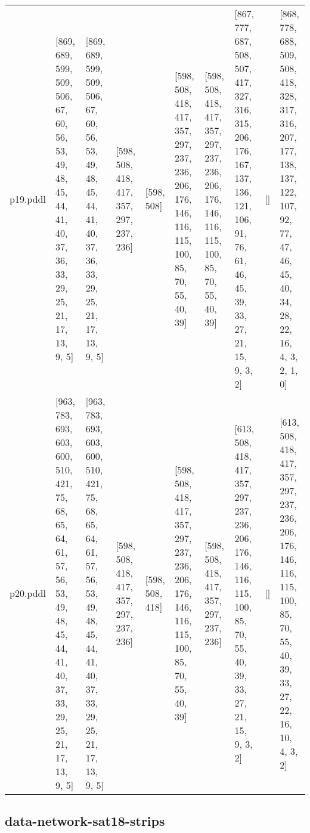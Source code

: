 \documentclass{article}
\begin{document}
\begin{tabular}{@{}lrrrrrrrrr@{}}
p19.pddl & \multicolumn{1}{|l|}{[869, 689, 599, 509, 506, 67, 60, 56, 53, 49, 48, 45, 44, 41, 40, 37, 36, 33, 29, 25, 21, 17, 13, 9, 5]} & \multicolumn{1}{|l|}{[869, 689, 599, 509, 506, 67, 60, 56, 53, 49, 48, 45, 44, 41, 40, 37, 36, 33, 29, 25, 21, 17, 13, 9, 5]} & \multicolumn{1}{|l|}{[598, 508, 418, 417, 357, 297, 237, 236]} & \multicolumn{1}{|l|}{[598, 508]} & \multicolumn{1}{|l|}{[598, 508, 418, 417, 357, 297, 237, 236, 206, 176, 146, 116, 115, 100, 85, 70, 55, 40, 39]} & \multicolumn{1}{|l|}{[598, 508, 418, 417, 357, 297, 237, 236, 206, 176, 146, 116, 115, 100, 85, 70, 55, 40, 39]} & \multicolumn{1}{|l|}{[867, 777, 687, 508, 507, 417, 327, 316, 315, 206, 176, 167, 137, 136, 121, 106, 91, 76, 61, 46, 45, 39, 33, 27, 21, 15, 9, 3, 2]} & \multicolumn{1}{|l|}{[]} & \multicolumn{1}{|l|}{[868, 778, 688, 509, 508, 418, 328, 317, 316, 207, 177, 138, 137, 122, 107, 92, 77, 47, 46, 45, 40, 34, 28, 22, 16, 4, 3, 2, 1, 0]} \\
p20.pddl & \multicolumn{1}{|l|}{[963, 783, 693, 603, 600, 510, 421, 75, 68, 65, 64, 61, 57, 56, 53, 49, 48, 45, 44, 41, 40, 37, 33, 29, 25, 21, 17, 13, 9, 5]} & \multicolumn{1}{|l|}{[963, 783, 693, 603, 600, 510, 421, 75, 68, 65, 64, 61, 57, 56, 53, 49, 48, 45, 44, 41, 40, 37, 33, 29, 25, 21, 17, 13, 9, 5]} & \multicolumn{1}{|l|}{[598, 508, 418, 417, 357, 297, 237, 236]} & \multicolumn{1}{|l|}{[598, 508, 418]} & \multicolumn{1}{|l|}{[598, 508, 418, 417, 357, 297, 237, 236, 206, 176, 146, 116, 115, 100, 85, 70, 55, 40, 39]} & \multicolumn{1}{|l|}{[598, 508, 418, 417, 357, 297, 237, 236]} & \multicolumn{1}{|l|}{[613, 508, 418, 417, 357, 297, 237, 236, 206, 176, 146, 116, 115, 100, 85, 70, 55, 40, 39, 33, 27, 21, 15, 9, 3, 2]} & \multicolumn{1}{|l|}{[]} & \multicolumn{1}{|l|}{[613, 508, 418, 417, 357, 297, 237, 236, 206, 176, 146, 116, 115, 100, 85, 70, 55, 40, 39, 33, 27, 22, 16, 10, 4, 3, 2]} \\
\end{tabular}

\hypertarget{h_values-data-network-sat18-strips}{}
\subsection*{data-network-sat18-strips}
\end{document}
